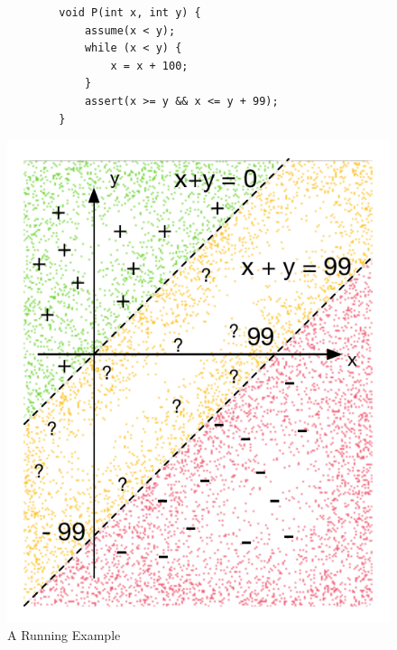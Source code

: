 \begin{figure}[t]
    \centering
    \begin{minipage}{.49\textwidth}
        \centering
        {\scriptsize\begin{verbatim}
        void P(int x, int y) {
            assume(x < y);
            while (x < y) {
                x = x + 100;
            }
            assert(x >= y && x <= y + 99);
        }\end{verbatim}}
        \includegraphics[scale=0.35]{figures/running-sampling.pdf}
        \caption{A Running Example}
        \label{fig:running:example}
    \end{minipage}
    \begin{minipage}{.49\textwidth}
        \centering

\end{minipage}
\end{figure}
